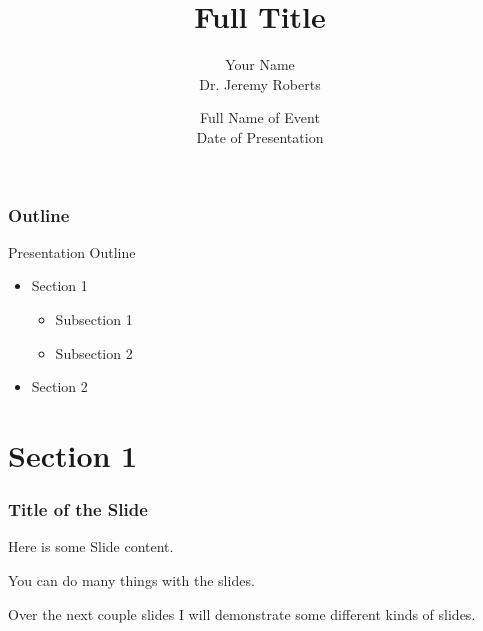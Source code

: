 \documentclass[fleqn]{beamer}
\title[Short Title]{
    Full Title}
\author[Your Name]{
    Your Name \\
    Dr. Jeremy Roberts}
\institute[Kansas State University]{
    Mechanical and Nuclear Engineering \\
    Kansas State University}
\date[Short Version]{
    Full Name of Event \\
    Date of Presentation}
\begin{document}
    \newcommand{\beginbackup}{
        \newcounter{framenumbervorappendix}
        \setcounter{framenumbervorappendix}{\value{framenumber}}
    }
    \newcommand{\backupend}{
        \addtocounter{framenumbervorappendix}{-\value{framenumber}}
        \addtocounter{framenumber}{\value{framenumbervorappendix}} 
    }
    
    \begin{frame}
        \titlepage
    \end{frame}
    
    \begin{frame}
        \frametitle{Outline}
        \begin{block}{Presentation Outline}
            \begin{itemize}
                \item Section 1
                \begin{itemize}
                    \item Subsection 1
                    \item Subsection 2
                \end{itemize}
                \item Section 2
            \end{itemize}
        \end{block}
    \end{frame}
    
    \section{Section 1}
    
    \begin{frame}
        \frametitle{Title of the Slide}
        Here is some Slide content.
        
        You can do many things with the slides.
        
        Over the next couple slides I will demonstrate some different kinds of slides.
    \end{frame}
    
\end{document}
